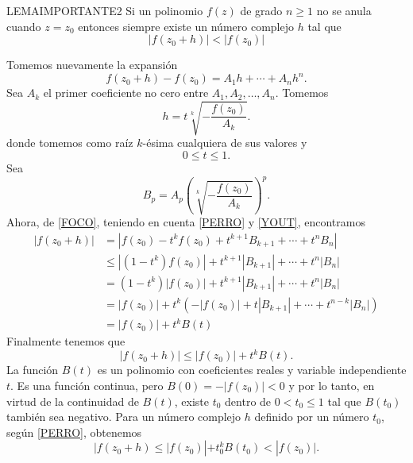 \begin{lemma}{}{LEMAIMPORTANTE2}
    Si un polinomio $f(z)$ de grado $n \geq 1$ no se anula cuando $z = z_0$ entonces siempre existe un número complejo $h$ tal que
    $$|f(z_0+h)|<|f(z_0)|$$

    \tcblower
    \demostracion Tomemos nuevamente la expansión
    \begin{equation}
        f(z_0+h)-f(z_0)=A_1h+\cdots +A_nh^n. \label{FOCO}
    \end{equation}
    Sea $A_k$ el primer coeficiente no cero entre $A_1,  A_2,  \dots,  A_n$. Tomemos
    \begin{equation}
        h=t \sqrt[k]{-\frac{f(z_0)}{A_k}}. \label{PERRO}
    \end{equation}
    donde tomemos como raíz $k$-ésima cualquiera de sus valores y
    \begin{equation}
        0 \leq t \leq 1. \label{YOUT}
    \end{equation}
    Sea
    $$B_p=A_p \left( \sqrt[k]{-\frac{f(z_0)}{A_k}} \right) ^p.$$
    Ahora, de \eqref{FOCO}, teniendo en cuenta \eqref{PERRO} y \eqref{YOUT}, encontramos
    \begin{align*}
        |f(z_0+h)| &= \left| f(z_0)-t^kf(z_0)+t^{k+1}B_{k+1}+ \cdots +t^nB_n \right| \\
        & \leq \left| \left( 1-t^k \right) f(z_0) \right| +t^{k+1}|B_{k+1}|+ \cdots +t^n |B_n| \\
        &=\left( 1-t^k \right) |f(z_0)| + t^{k+1}|B_{k+1}|+ \cdots + t^n|B_n| \\
        &=|f(z_0)|+t^k \left( -|f(z_0)|+t|B_{k+1}|+ \cdots + t^{n-k}|B_n| \right) \\
        &=|f(z_0)| + t^k B(t)
    \end{align*}
    Finalmente tenemos que
    $$|f(z_0+h)| \leq |f(z_0)| + t^k B(t).$$
    La función $B(t)$ es un polinomio con coeficientes reales y variable independiente $t$. Es una función continua, pero $B (0) = -|f (z_0)| <0$ y por lo tanto, en virtud de la continuidad de $B(t)$, existe $t_0$ dentro de $0 < t_0 \leq 1$ tal que $B(t_0)$ también sea negativo. Para un número complejo $h$ definido por un número $t_0$, según \eqref{PERRO}, obtenemos
    $$|f(z_0+h) \leq |f(z_0)| + t_0^k B(t_0) < |f(z_0)|.$$
\end{lemma}

